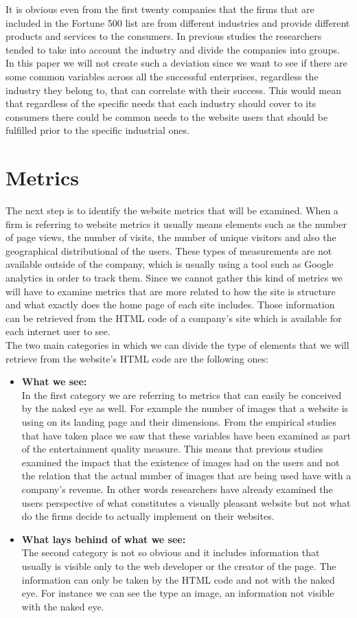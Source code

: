 \documentclass{book}
\begin{document}
It is obvious even from the first twenty companies that the firms that are included in the Fortune 500 list are from different industries and provide different products and services to the consumers. In previous studies the researchers tended to take into account the industry and divide the companies into groups. In this paper we will not create such a deviation since we want to see if there are some common variables across all the successful enterprises, regardless the industry they belong to, that can correlate with their success. This would mean that regardless of the specific needs that each industry should cover to its consumers there could be common needs to the website users that should be fulfilled prior to the specific industrial ones.
\newpage
\section{Metrics}
The next step is to identify the website metrics that will be examined. When a firm is referring to website metrics it usually means elements such as the number of page views, the number of visits, the number of unique visitors and also the geographical distributional of the users. These types of measurements are not available outside of the company, which is usually using a tool such as Google analytics\cite{key36} in order to track them. Since we cannot gather this kind of metrics we will have to examine metrics that are more related to how the site is structure and what exactly does the home page of each site includes. Those information can be retrieved from the HTML code of a company's site which is available for each internet user to see.\\
The two main categories in which we can divide the type of elements that we will retrieve from the website's HTML code are the following ones:
\begin{itemize}
\item \textbf{What we see:}\\
In the first category we are referring to metrics that can easily be conceived by the naked eye as well. For example the number of images that a website is using on its landing page and their dimensions. From the empirical studies that have taken place we saw that these variables have been examined as part of the entertainment quality measure. This means that previous studies examined the impact that the existence of images had on the users and not the relation that the actual number of images that are being used have with a company's revenue. In other words researchers have already examined the users perspective of what constitutes a visually pleasant website but not what do the firms decide to actually implement on their websites.
\item \textbf{What lays behind of what we see:}\\
The second category is not so obvious and it includes information that usually is visible only to the web developer or the creator of the page. The information can only be taken by the HTML code and not with the naked eye. For instance we can see the type an image, an information not visible with the naked eye.
\end{itemize}
\end{document}
